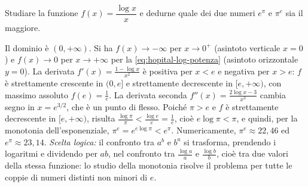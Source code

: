 \begin{esercizio}\label{es:e-pi}
Studiare la funzione $f(x)=\dfrac{\log x}{x}$ e dedurne quale dei due numeri $e^{\pi}$ e
$\pi^{e}$ sia il maggiore.
\begin{soluzione}
Il dominio è $(0,+\infty)$. Si ha $f(x)\to-\infty$ per $x\to0^{+}$ (asintoto verticale
$x=0$) e $f(x)\to0$ per $x\to+\infty$ per la \eqref{eq:hopital-log-potenza} (asintoto
orizzontale $y=0$). La derivata $f'(x)=\frac{1-\log x}{x^{2}}$ è positiva per $x<e$ e
negativa per $x>e$: $f$ è strettamente crescente in $(0,e]$ e strettamente decrescente in
$[e,+\infty)$, con massimo assoluto $f(e)=\frac1e$. La derivata seconda
$f''(x)=\frac{2\log x-3}{x^{3}}$ cambia segno in $x=e^{3/2}$, che è un punto di flesso.
Poiché $\pi>e$ e $f$ è strettamente decrescente in $[e,+\infty)$, risulta
$\frac{\log\pi}{\pi}<\frac{\log e}{e}=\frac1e$, cioè $e\log\pi<\pi$, e quindi, per la
monotonia dell'esponenziale, $\pi^{e}=e^{e\log\pi}<e^{\pi}$. Numericamente,
$\pi^{e}\approx22{,}46$ ed $e^{\pi}\approx23{,}14$. \emph{Scelta logica:} il confronto tra
$a^{b}$ e $b^{a}$ si trasforma, prendendo i logaritmi e dividendo per $ab$, nel confronto
tra $\frac{\log a}a$ e $\frac{\log b}b$, cioè tra due valori della stessa funzione: lo
studio della monotonia risolve il problema per tutte le coppie di numeri distinti non
minori di $e$.
\end{soluzione}
\end{esercizio}
